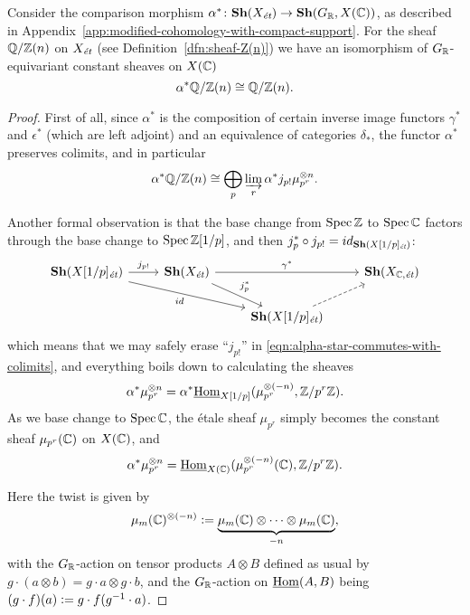 \documentclass{article}
\numberwithin{equation}{section}
\begin{document}
\begin{proposition}
  \label{propn:image-of-QZn-under-alpha}
  Consider the comparison morphism
  $\alpha^*\colon \mathbf{Sh} (X_\et) \to \mathbf{Sh} (G_\RR, X (\CC))$,
  as described in
  Appendix~\ref{app:modified-cohomology-with-compact-support}. For the sheaf
  $\QQ/\ZZ (n)$ on $X_\et$ (see Definition~\ref{dfn:sheaf-Z(n)}) we have an
  isomorphism of $G_\RR$-equivariant constant sheaves on $X (\CC)$
  $$\alpha^* \QQ/\ZZ (n) \cong \QQ/\ZZ (n).$$

  \begin{proof}
    First of all, since $\alpha^*$ is the composition of certain inverse image
    functors $\gamma^*$ and $\epsilon^*$ (which are left adjoint) and an
    equivalence of categories $\delta_*$, the functor $\alpha^*$ preserves
    colimits, and in particular
    \begin{equation}
      \label{eqn:alpha-star-commutes-with-colimits}
      \alpha^* \QQ/\ZZ (n) \cong \bigoplus_p \varinjlim_r \alpha^* j_{p!} \mu_{p^r}^{\otimes n}.
    \end{equation}

    Another formal observation is that the base change from $\Spec \ZZ$ to
    $\Spec \CC$ factors through the base change to $\Spec \ZZ [1/p]$, and then
    $j_p^* \circ j_{p!} = id_{\mathbf{Sh} (X [1/p]_\et)}$:
    \[ \begin{tikzcd}
      \mathbf{Sh} (X [1/p]_\et) \ar{r}{j_{p!}}\ar{drr}[swap]{id} & \mathbf{Sh} (X_\et) \ar{rr}{\gamma^*}\ar{dr}{j_p^*} & & \mathbf{Sh} (X_{\CC,\text{\it ét}}) \\
      & & \mathbf{Sh} (X [1/p]_\et)\ar[dashed]{ur}
    \end{tikzcd} \]
    which means that we may safely erase ``$j_{p!}$'' in
    \eqref{eqn:alpha-star-commutes-with-colimits}, and everything boils down to
    calculating the sheaves
    $$\alpha^* \mu_{p^r}^{\otimes n} = \alpha^* \iHom_{X [1/p]} (\mu_{p^r}^{\otimes (-n)}, \ZZ/p^r \ZZ).$$
    As we base change to $\Spec \CC$, the étale sheaf $\mu_{p^r}$ simply becomes
    the constant sheaf $\mu_{p^r} (\CC)$ on $X (\CC)$, and
    $$\alpha^* \mu_{p^r}^{\otimes n} = \iHom_{X (\CC)} (\mu_{p^r}^{\otimes (-n)} (\CC), \ZZ/p^r \ZZ).$$

    Here the twist is given by
    $$\mu_m (\CC)^{\otimes (-n)} \dfn \underbrace{\mu_m (\CC)\otimes\cdots\otimes\mu_m (\CC)}_{-n},$$
    with the $G_\RR$-action on tensor products $A\otimes B$ defined as usual
    by $g\cdot (a\otimes b) = g\cdot a\otimes g\cdot b$, and the
    $G_\RR$-action on $\iHom (A,B)$ being
    $(g\cdot f) (a) \dfn g\cdot f (g^{-1}\cdot a)$.


\end{proof}
\end{proposition}
\end{document}

